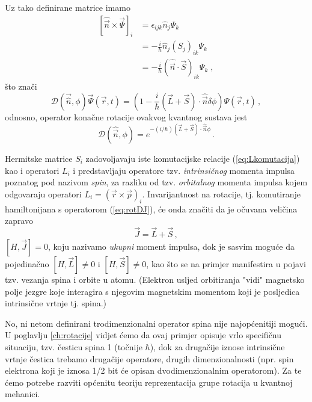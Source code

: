 Uz tako definirane matrice imamo
\begin{equation}
\begin{split}
[\hat{\vec{n}}\times\vec{\Psi}]_i &=
\epsilon_{ijk}\hat{n}_j\Psi_k \\
&= -\frac{i}{\hbar}\hat{n}_j (S_j)_{ik}\Psi_k\\
&= -\frac{i}{\hbar}(\hat{\vec{n}}\cdot\vec{S})_{ik}\Psi_k \;,
\end{split}
\end{equation}
što znači
\begin{equation*}
\mathcal{D}(\vec{\hat{n}},\phi)\vec{\Psi}(\vec{r}, t)=
 \left(1-\frac{i}{\hbar}(\vec{L}+\vec{S})\cdot\hat{\vec{n}}\delta\phi \right)
  \Psi(\vec{r}, t) \,,
\end{equation*}
odnosno, operator konačne rotacije ovakvog kvantnog sustava jest
\begin{equation}
\mathcal{D}(\hat{\vec{n}}, \phi)=
 e^{-(i/\hbar)(\vec{L}+\vec{S})\cdot\hat{\vec{n}}\phi} \,.
 \label{eq:rotDJ}
\end{equation}

Hermitske matrice $S_i$ zadovoljavaju iste komutacijske relacije
(\ref{eq:Lkomutacija}) kao i operatori $L_i$ i predstavljaju operatore tzv.
\emph{intrinsičnog}  momenta impulsa poznatog pod nazivom \emph{spin},
za razliku od tzv. \emph{orbitalnog} momenta impulsa kojem odgovaraju
operatori $L_i = (\vec{r}\times\vec{p})_{i}$.
Invarijantnost na rotacije, tj. komutiranje hamiltonijana s operatorom
(\ref{eq:rotDJ}), će onda značiti da je očuvana veličina zapravo
\begin{equation}
\vec{J}=\vec{L}+\vec{S} \,,
\end{equation}
$[H, \vec{J}] = 0$, koju nazivamo \emph{ukupni} moment impulsa, dok je sasvim moguće
da pojedinačno $[H, \vec{L}] \neq 0$ i $[H, \vec{S}] \neq 0$, kao što se na
primjer manifestira u pojavi tzv. vezanja spina i orbite u atomu.
(Elektron usljed orbitiranja "vidi" magnetsko polje
jezgre koje interagira s njegovim magnetskim momentom koji je posljedica
intrinsične vrtnje tj. spina.)

No, ni netom definirani trodimenzionalni operator spina nije najopćenitiji mogući.
U poglavlju \ref{ch:rotacije} vidjet ćemo da ovaj primjer opisuje
vrlo specifičnu situaciju, tzv. česticu spina 1 (točnije $\hbar$),
dok za drugačije iznose intrinsične vrtnje čestica trebamo drugačije
operatore, drugih dimenzionalnosti (npr. spin elektrona koji je iznosa 1/2 
bit će opisan dvodimenzionalnim operatorom).
Za te ćemo potrebe razviti općenitu teoriju
reprezentacija grupe rotacija u kvantnoj mehanici.


